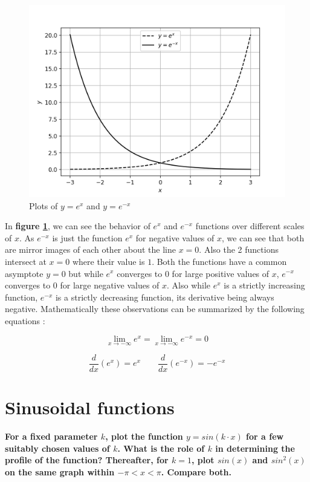 \documentclass[12]{article}
\begin{document}
    \begin{figure}[H]
        \centering
        \includegraphics[width=\textwidth]{plots/q1p2.png}
        \caption{Plots of $y = e^x$ and $y = e^{-x}$}
        \label{fig:q1p2}
    \end{figure}
    
    In \textbf{figure \ref{fig:q1p2}}, we can see the behavior of $e^x$ and  $e^{-x}$ functions over different scales of $x$. As $e^{-x}$ is just the function $e^x$ for negative values of $x$, we can see that both are mirror images of each other about the line $x = 0$. Also the 2 functions intersect at $x = 0$ where their value is $1$. Both the functions have a common asymptote $y = 0$ but while $e^x$ converges to 0 for large positive values of $x$, $e^{-x}$ converges to 0 for large negative values of $x$. Also while $e^x$ is a strictly increasing function, $e^{-x}$ is a strictly decreasing function, its derivative being always negative. Mathematically these observations can be summarized by the following equations :
    
        \begin{equation}
            \lim_{x\to-\infty}e^x = \lim_{x\to-\infty}e^{-x} = 0
        \end{equation}
        
        \begin{equation}
                \frac{d}{dx}(e^x) = e^x\qquad\frac{d}{dx}(e^{-x}) = -e^{-x}
        \end{equation}
    \newpage
    
    \section{Sinusoidal functions}
    \textbf{For a fixed parameter $k$, plot the function $y = sin(k\cdot x)$ for a few suitably chosen values of $k$. What is the role of $k$ in determining the profile of the function? Thereafter, for $k = 1$, plot $sin(x)$ and $sin^2(x)$ on the same graph within $-\pi<x<\pi$. Compare both.}
    
\end{document}
